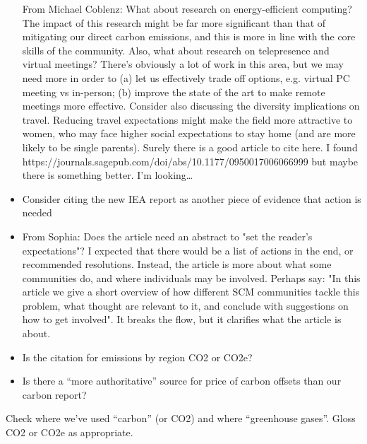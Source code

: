 \documentclass[12pt]{article}
\begin{document}
\begin{itemize}
From Michael Coblenz:
What about research on energy-efficient computing? The impact of this research might be far more significant than that of mitigating our direct carbon emissions, and this is more in line with the core skills of the community.
Also, what about research on telepresence and virtual meetings? There's obviously a lot of work in this area, but we may need more in order to (a) let us effectively trade off options, e.g. virtual PC meeting vs in-person; (b) improve the state of the art to make remote meetings more effective.
Consider also discussing the diversity implications on travel. Reducing travel expectations might make the field more attractive to women, who may face higher social expectations to stay home (and are more likely to be single parents). Surely there is a good article to cite here. I found https://journals.sagepub.com/doi/abs/10.1177/0950017006066999 but maybe there is something better. I'm looking…
\item 
Consider citing the new IEA report as another piece of evidence that action is needed
\item 
From Sophia: Does the article need an abstract to "set the reader's expectations"? I expected that there would be a list of actions in the end, or recommended resolutions. Instead, the article is more about what some communities do, and where individuals may be involved.  Perhaps say: "In this article we give a short overview of how different SCM communities tackle this problem, what thought are relevant to it, and conclude with suggestions on how to get involved". It breaks the flow, but it clarifies what the article is about.
\item 
Is the citation for emissions by region CO2 or CO2e?
\item 
Is there a ``more authoritative'' source for price of carbon offsets than
our carbon report?
\end{itemize}
\item 
Check where we've used ``carbon'' (or CO2) and where ``greenhouse gases''.  Gloss CO2 or CO2e as appropriate.
\fi

\end{document}
